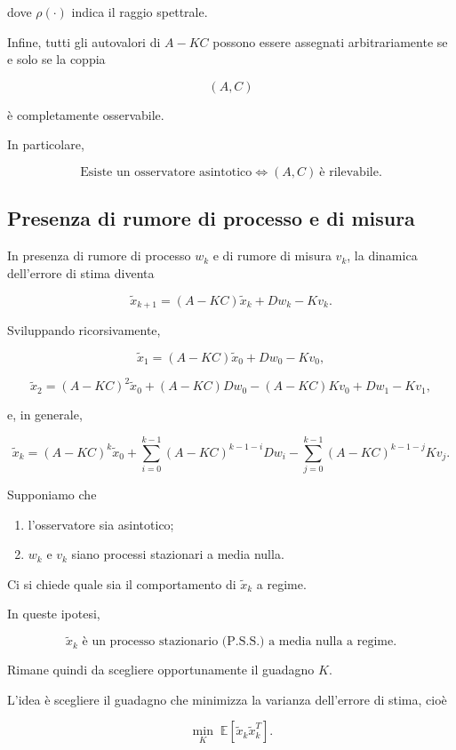 \documentclass[11pt,a4paper]{article}
\begin{document}
dove $\rho(\cdot)$ indica il raggio spettrale.

Infine, tutti gli autovalori di $A-KC$ possono essere assegnati arbitrariamente se e solo se la coppia

\[
(A,C)
\]

è completamente osservabile.

In particolare,

\[
\boxed{
\text{Esiste un osservatore asintotico}
\iff
(A,C)\ \text{è rilevabile}.
}
\]

\subsection*{Presenza di rumore di processo e di misura}

In presenza di rumore di processo $w_k$ e di rumore di misura $v_k$, la dinamica dell'errore di stima diventa

\[
\tilde{x}_{k+1}
=
(A-KC)\tilde{x}_k
+
Dw_k
-
Kv_k.
\]

Sviluppando ricorsivamente,

\[
\tilde{x}_1
=
(A-KC)\tilde{x}_0
+
Dw_0
-
Kv_0,
\]

\[
\tilde{x}_2
=
(A-KC)^2\tilde{x}_0
+
(A-KC)Dw_0
-
(A-KC)Kv_0
+
Dw_1
-
Kv_1,
\]

e, in generale,

\[
\boxed{
\tilde{x}_k
=
(A-KC)^k\tilde{x}_0
+
\sum_{i=0}^{k-1}
(A-KC)^{k-1-i}Dw_i
-
\sum_{j=0}^{k-1}
(A-KC)^{k-1-j}Kv_j.
}
\]

Supponiamo che

\begin{enumerate}
    \item l'osservatore sia asintotico;
    \item $w_k$ e $v_k$ siano processi stazionari a media nulla.
\end{enumerate}

Ci si chiede quale sia il comportamento di $\tilde{x}_k$ a regime.

In queste ipotesi,

\[
\boxed{
\tilde{x}_k
\text{ è un processo stazionario (P.S.S.) a media nulla a regime.}
}
\]

Rimane quindi da scegliere opportunamente il guadagno $K$.

L'idea è scegliere il guadagno che minimizza la varianza dell'errore di stima, cioè

\[
\boxed{
\min_K
\;
\mathbb{E}
\!\left[
\tilde{x}_k
\tilde{x}_k^{T}
\right].
}
\]
\end{document}

